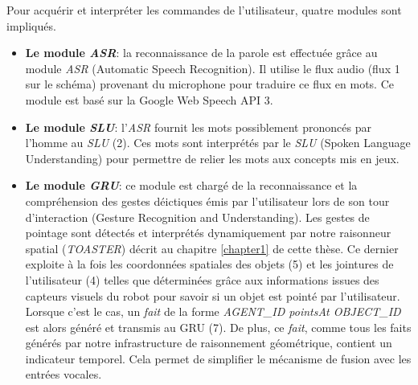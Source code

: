\documentclass[a4paper,11pt,twoside]{StyleThese}
\begin{document}
Pour acquérir et interpréter les commandes de l'utilisateur, quatre modules sont impliqués.

\begin{itemize}
\item \textbf{Le module \textit{ASR}}: la reconnaissance de la parole est effectuée grâce au module \textit{ASR} (Automatic Speech Recognition). Il utilise le flux audio (flux 1 sur le schéma) provenant du microphone pour traduire ce flux en mots. Ce module est basé sur la Google Web Speech API 3.

\item \textbf{Le module \textit{SLU}}: l'\textit{ASR} fournit les mots possiblement prononcés par l'homme au \textit{SLU} (2). Ces mots sont interprétés par le \textit{SLU} (Spoken Language Understanding) pour permettre de relier les mots aux concepts mis en jeux.

\item \textbf{Le module \textit{GRU}}: ce module est chargé de la reconnaissance et la compréhension des gestes déictiques émis par l’utilisateur lors de son tour d’interaction (Gesture Recognition and Understanding). Les gestes de pointage sont détectés et interprétés dynamiquement par notre raisonneur spatial (\textit{TOASTER}) décrit au chapitre \ref{chapter1} de cette thèse. Ce dernier exploite à la fois les coordonnées spatiales des objets (5) et les jointures de l’utilisateur (4) telles que déterminées grâce aux informations issues des capteurs visuels du robot pour savoir si un objet est pointé par l’utilisateur. Lorsque c’est le cas, un \textit{fait} de la forme \textit{AGENT\_ID pointsAt
OBJECT\_ID} est alors généré et transmis au GRU (7). De plus, ce \textit{fait}, comme tous les faits générés par notre infrastructure de raisonnement géométrique, contient un indicateur temporel. Cela permet de simplifier le mécanisme de
fusion avec les entrées vocales.


\end{itemize}
\end{document}
